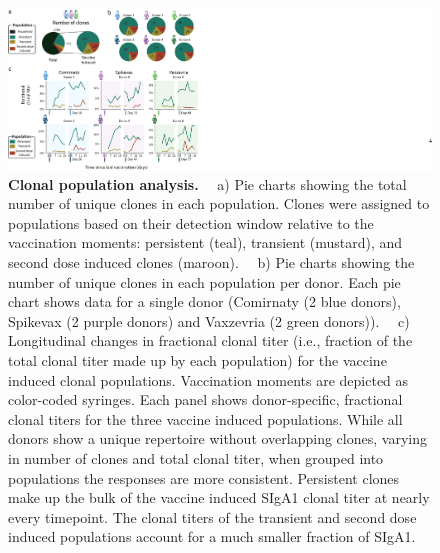 \begin{figure}[!htb]
  \center
  \includegraphics[]{Chapter.4/Figures/f3.png}
  \caption{\textbf{Clonal population analysis.} ~~a) Pie charts showing the total number of unique clones in each population. Clones were assigned to populations based on their detection window relative to the vaccination moments: persistent (teal), transient (mustard), and second dose induced clones (maroon). ~~b) Pie charts showing the number of unique clones in each population per donor. Each pie chart shows data for a single donor (Comirnaty (2 blue donors), Spikevax (2 purple donors) and Vaxzevria (2 green donors)). ~~c) Longitudinal changes in fractional clonal titer (i.e., fraction of the total clonal titer made up by each population) for the vaccine induced clonal populations. Vaccination moments are depicted as color-coded syringes. Each panel shows donor-specific, fractional clonal titers for the three vaccine induced populations. While all donors show a unique repertoire without overlapping clones, varying in number of clones and total clonal titer, when grouped into populations the responses are more consistent. Persistent clones make up the bulk of the vaccine induced SIgA1 clonal titer at nearly every timepoint. The clonal titers of the transient and second dose induced populations account for a much smaller fraction of SIgA1.}
  \label{fig:fig4.3}
\end{figure}


